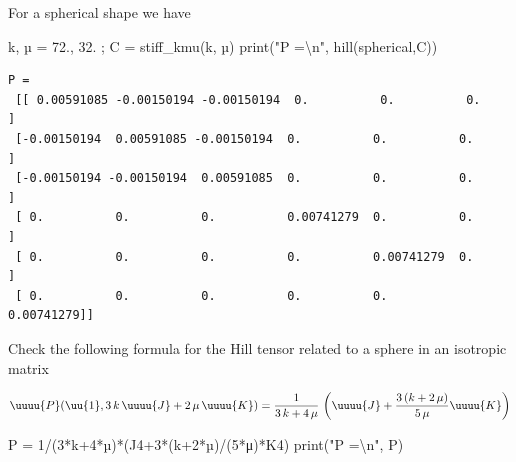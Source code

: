 \documentclass[
  letterpaper,
  DIV=11,
  numbers=noendperiod]{scrreprt}
\newenvironment{Shaded}{\begin{snugshade}}{\end{snugshade}}
\newcommand{\BuiltInTok}[1]{\textcolor[rgb]{0.00,0.23,0.31}{#1}}
\newcommand{\CharTok}[1]{\textcolor[rgb]{0.13,0.47,0.30}{#1}}
\newcommand{\DecValTok}[1]{\textcolor[rgb]{0.68,0.00,0.00}{#1}}
\newcommand{\FloatTok}[1]{\textcolor[rgb]{0.68,0.00,0.00}{#1}}
\newcommand{\NormalTok}[1]{\textcolor[rgb]{0.00,0.23,0.31}{#1}}
\newcommand{\OperatorTok}[1]{\textcolor[rgb]{0.37,0.37,0.37}{#1}}
\newcommand{\StringTok}[1]{\textcolor[rgb]{0.13,0.47,0.30}{#1}}
\begin{document}
\begin{tcolorbox}[enhanced jigsaw, left=2mm, bottomrule=.15mm, colbacktitle=quarto-callout-caution-color!10!white, colback=white, colframe=quarto-callout-caution-color-frame, rightrule=.15mm, bottomtitle=1mm, toptitle=1mm, titlerule=0mm, title={Exercise}, toprule=.15mm, arc=.35mm, opacityback=0, opacitybacktitle=0.6, leftrule=.75mm, breakable, coltitle=black]

For a spherical shape we have

\begin{Shaded}
\begin{Highlighting}[]
\NormalTok{k, µ }\OperatorTok{=} \FloatTok{72.}\NormalTok{, }\FloatTok{32.} \OperatorTok{;}\NormalTok{ C }\OperatorTok{=}\NormalTok{ stiff\_kmu(k, µ)}
\BuiltInTok{print}\NormalTok{(}\StringTok{"P =}\CharTok{\textbackslash{}n}\StringTok{"}\NormalTok{, hill(spherical,C))}
\end{Highlighting}
\end{Shaded}

\begin{verbatim}
P =
 [[ 0.00591085 -0.00150194 -0.00150194  0.          0.          0.        ]
 [-0.00150194  0.00591085 -0.00150194  0.          0.          0.        ]
 [-0.00150194 -0.00150194  0.00591085  0.          0.          0.        ]
 [ 0.          0.          0.          0.00741279  0.          0.        ]
 [ 0.          0.          0.          0.          0.00741279  0.        ]
 [ 0.          0.          0.          0.          0.          0.00741279]]
\end{verbatim}

Check the following formula for the Hill tensor related to a sphere in
an isotropic matrix

\[
\uuuu{P}(\uu{1},3\,k\,\uuuu{J}+2\,\mu\,\uuuu{K})=\frac{1}{3\,k+4\,\mu}\,\left(\uuuu{J}+\frac{3\,(k+2\,\mu)}{5\,\mu}\uuuu{K}\right)
\]

\begin{Shaded}
\begin{Highlighting}[]
\NormalTok{P }\OperatorTok{=} \DecValTok{1}\OperatorTok{/}\NormalTok{(}\DecValTok{3}\OperatorTok{*}\NormalTok{k}\OperatorTok{+}\DecValTok{4}\OperatorTok{*}\NormalTok{µ)}\OperatorTok{*}\NormalTok{(J4}\OperatorTok{+}\DecValTok{3}\OperatorTok{*}\NormalTok{(k}\OperatorTok{+}\DecValTok{2}\OperatorTok{*}\NormalTok{µ)}\OperatorTok{/}\NormalTok{(}\DecValTok{5}\OperatorTok{*}\NormalTok{μ)}\OperatorTok{*}\NormalTok{K4)}
\BuiltInTok{print}\NormalTok{(}\StringTok{"P =}\CharTok{\textbackslash{}n}\StringTok{"}\NormalTok{, P)}
\end{Highlighting}
\end{Shaded}


\end{tcolorbox}
\end{document}

